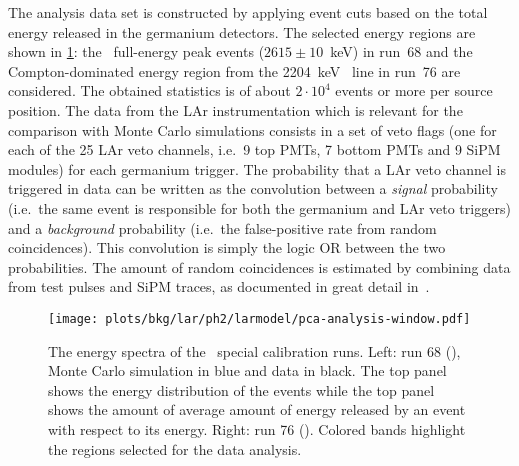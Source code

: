 The analysis data set is constructed by applying event cuts based on the total energy
released in the germanium detectors. The selected energy regions are shown in
\cref{fig:bkg:lar:ph2:pcalib-data}: the \Tl\ full-energy peak events ($2615 \pm 10$~keV)
in run~68 and the Compton-dominated energy region from the 2204~keV \Bih\ line in run~76
are considered. The obtained statistics is of about $2 \cdot 10^4$ events or more per
source position.  The data from the LAr instrumentation which is relevant for the
comparison with Monte Carlo simulations consists in a set of veto flags (one for each
of the 25 LAr veto channels, i.e.~9 top PMTs, 7 bottom PMTs and 9 SiPM modules) for each
germanium trigger.  The probability that a LAr veto channel is triggered in data can be
written as the convolution between a \emph{signal} probability (i.e.~the same event is responsible
for both the germanium and LAr veto triggers) and a \emph{background} probability (i.e.~the
false-positive rate from random coincidences). This convolution is simply the logic OR
between the two probabilities. The amount of random coincidences is estimated by combining
data from test pulses and SiPM traces, as documented in great detail
in~\cite{Wiesinger2021}.

\begin{figure}
  \centering
  \texttt{[image: plots/bkg/lar/ph2/larmodel/pca-analysis-window.pdf]}
  \caption{%
    The energy spectra of the \phasetwo\ special calibration runs. Left: run 68 (\Th),
    Monte Carlo simulation in blue and data in black. The top panel shows the energy
    distribution of the events while the top panel shows the amount of average amount of
    energy released by an event with respect to its energy. Right: run 76 (\Ra). Colored
    bands highlight the regions selected for the data analysis.
  }\label{fig:bkg:lar:ph2:pcalib-data}
\end{figure}

